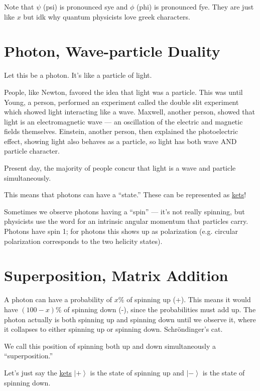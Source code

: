 \documentclass[
]{article}
\let\oldhyperref\hyperref
\renewcommand{\hyperref}[2][]{\oldhyperref[#1]{\underline{#2}}}
\providecommand{\ket}[1]{\left\lvert #1 \right\rangle}
\begin{document}
Note that \(\psi\) (psi) is pronounced sye and \(\phi\) (phi) is
pronounced fye. They are just like \(x\) but idk why quantum physicists
love greek characters.

\section{Photon, Wave-particle
  Duality}\label{photons-wave-particle-duality}

Let this be a photon. It's like a particle of light.


People, like Newton, favored the idea that light was a particle. This
was until Young, a person, performed an experiment called the double
slit experiment which showed light interacting like a wave. Maxwell,
another person, showed that light is an electromagnetic wave --- an
oscillation of the electric and magnetic fields themselves. Einstein,
another person, then explained the photoelectric effect, showing light
also behaves as a particle, so light has both wave AND particle
character.

Present day, the majority of people concur that light is a wave and
particle simultaneously.

This means that photons can have a ``state.'' These can be represented
as \hyperref[ket-states]{kets}!

Sometimes we observe photons having a ``spin'' --- it's not really
spinning, but physicists use the word for an intrinsic angular momentum
that particles carry. Photons have spin 1; for photons this shows up
as polarization (e.g. circular polarization corresponds to the two
helicity states).

\section{Superposition, Matrix
  Addition}\label{superpositions-matrix-addition}

A photon can have a probability of \(x\%\) of spinning up (+). This
means it would have \((100-x)\%\) of spinning down (-), since the
probabilities must add up. The photon actually is both spinning up and
spinning down until we observe it, where it collapses to either spinning
up or spinning down. Schröndinger's cat.


We call this position of spinning both up and down simultaneously a
``superposition.''

Let's just say the \hyperref[ket-states]{kets} \(\ket{+}\) is the state of spinning up and \(\ket{-}\)
is the state of spinning down.
\end{document}
